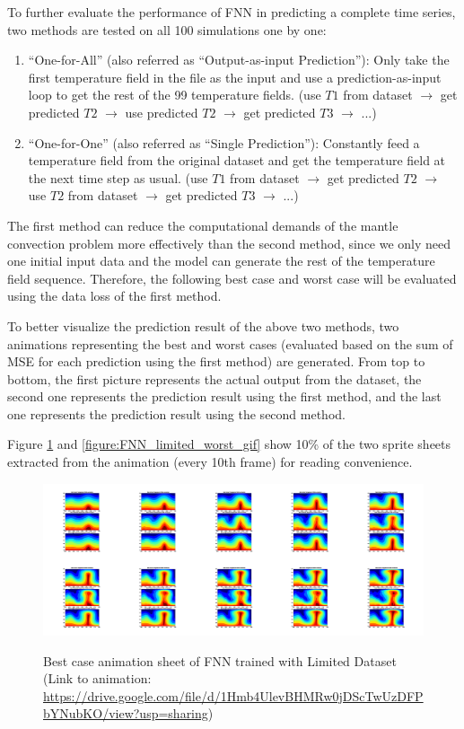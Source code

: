 To further evaluate the performance of FNN in predicting a complete time series, two methods are tested on all 100 simulations one by one: 

\begin{enumerate}
  \item ``One-for-All'' (also referred as ``Output-as-input Prediction''): Only take the first temperature field in the file as the input and use a prediction-as-input loop to get the rest of the 99 temperature fields. (use $T1$ from dataset $\rightarrow$ get predicted $T2$ $\rightarrow$ use predicted $T2$ $\rightarrow$ get predicted $T3$ $\rightarrow$ ...)
  \item ``One-for-One'' (also referred as ``Single Prediction''): Constantly feed a temperature field from the original dataset and get the temperature field at the next time step as usual. (use $T1$ from dataset $\rightarrow$ get predicted $T2$ $\rightarrow$ use $T2$ from dataset $\rightarrow$ get predicted $T3$ $\rightarrow$ ...)
\end{enumerate}

The first method can reduce the computational demands of the mantle convection problem more effectively than the second method, since we only need one initial input data and the model can generate the rest of the temperature field sequence. Therefore, the following best case and worst case will be evaluated using the data loss of the first method.

To better visualize the prediction result of the above two methods, two animations representing the best and worst cases (evaluated based on the sum of MSE for each prediction using the first method) are generated. From top to bottom, the first picture represents the actual output from the dataset, the second one represents the prediction result using the first method, and the last one represents the prediction result using the second method.

Figure \ref{figure:FNN_limited_best_gif} and \ref{figure:FNN_limited_worst_gif} show 10\% of the two sprite sheets extracted from the animation (every 10th frame) for reading convenience.

\begin{figure}[H]
    \centering
    \caption{Best case animation sheet of FNN trained with Limited Dataset (Link to animation: \url{https://drive.google.com/file/d/1Hmb4UlevBHMRw0jDScTwUzDFPbYNubKO/view?usp=sharing})}
    \includegraphics[scale=0.10]{figures/mantle_convection_images/limited_dataset/FNN_Best_GIF_sheet.png}
    \label{figure:FNN_limited_best_gif}
\end{figure}


